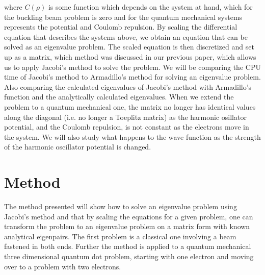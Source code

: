 \documentclass{emulateapj}
\begin{document}
where $C(\rho)$ is some function which depends on the system at hand, which for the buckling beam problem is zero and for the quantum mechanical systems represents the potential and Coulomb repulsion. By scaling the differential equation that describes the systems above, we obtain an equation that can be solved as an eigenvalue problem. The scaled equation is then discretized and set up as a matrix, which method  was discussed in our previous paper\cite{1}, which allows us to apply Jacobi's method to solve the problem. We will be comparing the CPU time of Jacobi's method to Armadillo's method for solving an eigenvalue problem. Also comparing the calculated eigenvalues of Jacobi's method with Armadillo's function and the analytically calculated eigenvalues. When we extend the problem to a quantum mechanical one, the matrix no longer has identical values along the diagonal (i.e. no longer a Toeplitz matrix) as the harmonic osillator potential, and the Coulomb repulsion, is not constant as the electrons move in the system. We will also study what happens to the wave function as the strength of the harmonic oscillator potential is changed. 


\section{Method}
\label{sec:method}
The method presented will show how to solve an eigenvalue problem using Jacobi's method and that by scaling the equations for a given problem, one can transform the problem to an eigenvalue problem on a matrix form with known analytical eigenpairs. The first problem is a classical one involving a beam fastened in both ends. Further the method is applied to a quantum mechanical three dimensional quantum dot problem, starting with one electron and moving over to a problem with two electrons.
\end{document}
